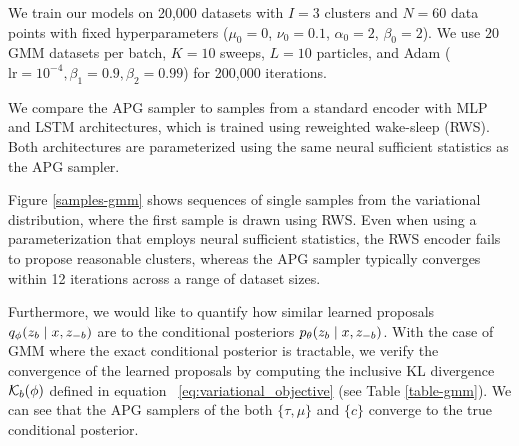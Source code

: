 \documentclass{article}
\theoremstyle{definition}
\begin{document}
We train our models on 20,000 datasets with $I = 3$ clusters and $N = 60$ data points with fixed hyperparameters ($\mu_0 = 0$, $\nu_0 = 0.1$, $\alpha_0 = 2$, $\beta_0 = 2$). We use $20$ GMM datasets per batch, $K=10$ sweeps, $L=10$ particles, and Adam ($\mathrm{lr} = 10^{-4}, \beta_1 = 0.9, \beta_2 = 0.99$) for 200,000 iterations.

We compare the APG sampler to samples from a standard encoder with MLP and LSTM architectures,  which is trained using reweighted wake-sleep (RWS). Both architectures are parameterized using the same neural sufficient statistics as the APG sampler.

Figure \ref{samples-gmm} shows sequences of single samples from the variational distribution, where the first sample is drawn using RWS. Even when using a parameterization that employs neural sufficient statistics, the RWS encoder fails to propose reasonable clusters, whereas the APG sampler typically converges within 12 iterations across a range of dataset sizes.

Furthermore, we would like to quantify how similar learned proposals $q_\phi(z_b \mid x, z_{-b})$ are to the conditional posteriors $p_\theta(z_b \mid x, z_{-b})$. With the case of GMM where the exact conditional posterior is tractable, we verify the convergence of the learned proposals by computing the inclusive KL divergence $\mathcal{K}_b(\phi)$ defined in equation ~\ref{eq:variational_objective} (see Table \ref{table-gmm}). We can see that the APG samplers of the both $\{\tau, \mu\}$ and $\{c\}$ converge to the true conditional posterior.


\end{document}
